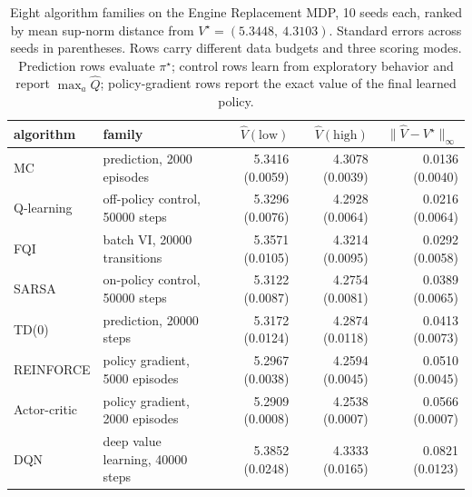 \begin{table}[h]
\centering
\small
\caption{Eight algorithm families on the Engine Replacement MDP, 10 seeds each, ranked by mean sup-norm distance from $V^\star = (5.3448,\ 4.3103)$. Standard errors across seeds in parentheses. Rows carry different data budgets and three scoring modes. Prediction rows evaluate $\pi^\star$; control rows learn from exploratory behavior and report $\max_a \hat{Q}$; policy-gradient rows report the exact value of the final learned policy.}
\label{tab:engine_algorithms}
\begin{tabular}{@{}llrrr@{}}
\hline
algorithm & family & $\hat{V}(\text{low})$ & $\hat{V}(\text{high})$ & $\|\hat{V} - V^\star\|_\infty$ \\
\hline
MC & prediction, 2000 episodes & 5.3416 (0.0059) & 4.3078 (0.0039) & 0.0136 (0.0040) \\
Q-learning & off-policy control, 50000 steps & 5.3296 (0.0076) & 4.2928 (0.0064) & 0.0216 (0.0064) \\
FQI & batch VI, 20000 transitions & 5.3571 (0.0105) & 4.3214 (0.0095) & 0.0292 (0.0058) \\
SARSA & on-policy control, 50000 steps & 5.3122 (0.0087) & 4.2754 (0.0081) & 0.0389 (0.0065) \\
TD(0) & prediction, 20000 steps & 5.3172 (0.0124) & 4.2874 (0.0118) & 0.0413 (0.0073) \\
REINFORCE & policy gradient, 5000 episodes & 5.2967 (0.0038) & 4.2594 (0.0045) & 0.0510 (0.0045) \\
Actor-critic & policy gradient, 2000 episodes & 5.2909 (0.0008) & 4.2538 (0.0007) & 0.0566 (0.0007) \\
DQN & deep value learning, 40000 steps & 5.3852 (0.0248) & 4.3333 (0.0165) & 0.0821 (0.0123) \\
\hline
\end{tabular}
\end{table}
